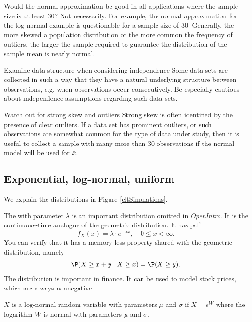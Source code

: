 \begin{example}{Would the normal approximation be good in all applications where the sample size is at least 30?}
Not necessarily. For example, the normal approximation for the log-normal example is questionable for a sample size of 30. Generally, the more skewed a population distribution or the more common the frequency of outliers, the larger the sample required to guarantee the distribution of the sample mean is nearly normal.
\end{example}

\begin{caution}
{Examine data structure when considering independence}
{Some data sets are collected in such a way that they have a natural underlying structure between observations, e.g. when observations occur consecutively. Be especially cautious about independence assumptions regarding such data sets.}
\end{caution}

\begin{caution}{Watch out for strong skew and outliers}
{Strong skew is often identified by the presence of clear outliers. If a data set has prominent outliers, or such observations are somewhat common for the type of data under study, then it is useful to collect a sample with many more than 30 observations if the normal model will be used for $\bar{x}$.}
\end{caution}



\subsection{Exponential, log-normal, uniform}
We explain the distributions in Figure \ref{cltSimulations}.

The  with parameter $\lambda$ is an important distribution omitted in \emph{OpenIntro}. It is the continuous-time analogue of the geometric distribution. It has pdf
\[
	f_X(x)=\lambda\cdot e^{-\lambda x},\quad 0\le x<\infty.
\]
You can verify that it has a memory-less property shared with the geometric distribution, namely
\[
	\P(X\ge x+y\mid X\ge x) = \P(X\ge y).
\]
The  distribution is important in finance. It can be used to model stock prices, which are always nonnegative.
\begin{df}\label{lognormal}
$X$ is a log-normal random variable with parameters $\mu$ and $\sigma$ if $X=e^W$ where the logarithm $W$ is normal with parameters $\mu$ and $\sigma$.
\end{df}

